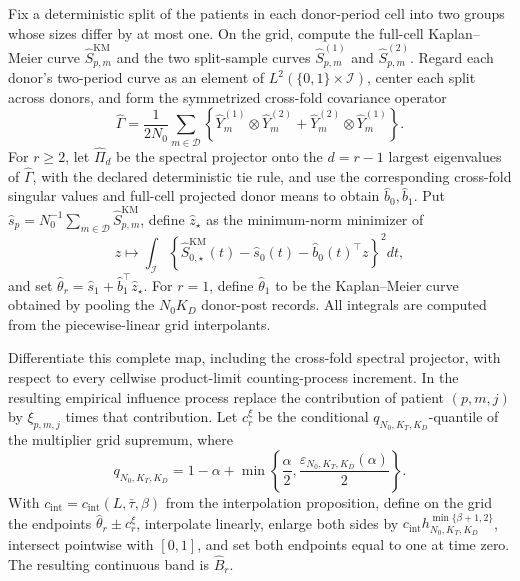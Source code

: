 Fix a deterministic split of the patients in each donor-period cell into two groups whose sizes differ by at most one.  On the grid, compute the full-cell Kaplan--Meier curve \(\widehat S^{\mathrm{KM}}_{p,m}\) and the two split-sample curves \(\widehat S^{(1)}_{p,m}\) and \(\widehat S^{(2)}_{p,m}\).  Regard each donor's two-period curve as an element of \(L^2(\{0,1\}\times\mathcal I)\), center each split across donors, and form the symmetrized cross-fold covariance operator
\[
 \widehat\Gamma=
 \frac{1}{2N_0}\sum_{m\in\mathcal D}
 \left\{\widehat Y_m^{(1)}\otimes\widehat Y_m^{(2)}+
 \widehat Y_m^{(2)}\otimes\widehat Y_m^{(1)}\right\}.
\]
For \(r\ge2\), let \(\widehat\Pi_d\) be the spectral projector onto the \(d=r-1\) largest eigenvalues of \(\widehat\Gamma\), with the declared deterministic tie rule, and use the corresponding cross-fold singular values and full-cell projected donor means to obtain \(\widehat b_0,\widehat b_1\).  Put \(\widehat s_p=N_0^{-1}\sum_{m\in\mathcal D}\widehat S^{\mathrm{KM}}_{p,m}\), define \(\widehat z_\star\) as the minimum-norm minimizer of
\[
 z\longmapsto\int_{\mathcal I}
 \left\{\widehat S^{\mathrm{KM}}_{0,\star}(t)-\widehat s_0(t)-
 \widehat b_0(t)^\top z\right\}^2dt,
\]
and set \(\widehat\theta_r=\widehat s_1+\widehat b_1^\top\widehat z_\star\).  For \(r=1\), define \(\widehat\theta_1\) to be the Kaplan--Meier curve obtained by pooling the \(N_0K_D\) donor-post records.  All integrals are computed from the piecewise-linear grid interpolants.

Differentiate this complete map, including the cross-fold spectral projector, with respect to every cellwise product-limit counting-process increment.  In the resulting empirical influence process replace the contribution of patient \((p,m,j)\) by \(\xi_{p,m,j}\) times that contribution.  Let \(c_r^\xi\) be the conditional \(q_{N_0,K_T,K_D}\)-quantile of the multiplier grid supremum, where
\[
 q_{N_0,K_T,K_D}=1-\alpha+
 \min\left\{\frac{\alpha}{2},\frac{\varepsilon_{N_0,K_T,K_D}(\alpha)}{2}\right\}.
\]
With \(c_{\mathrm{int}}=c_{\mathrm{int}}(L,\bar\tau,\beta)\) from the interpolation proposition, define on the grid the endpoints \(\widehat\theta_r\pm c_r^\xi\), interpolate linearly, enlarge both sides by \(c_{\mathrm{int}}h_{N_0,K_T,K_D}^{\min\{\beta+1,2\}}\), intersect pointwise with \([0,1]\), and set both endpoints equal to one at time zero.  The resulting continuous band is \(\widehat B_r\).